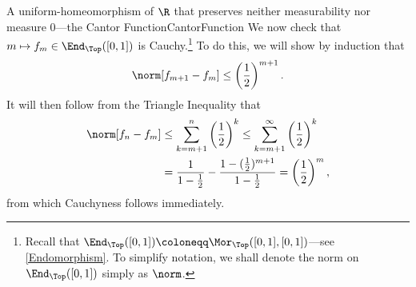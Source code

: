 \begin{exm}{A uniform-homeomorphism of $\R$ that preserves neither measurability nor measure $0$---the Cantor Function}{CantorFunction}
We now check that $m\mapsto f_m\in \End _{\Top}([0,1])$ is Cauchy.\footnote{Recall that $\End _{\Top}([0,1])\coloneqq \Mor _{\Top}([0,1],[0,1])$---see \cref{Endomorphism}.  To simplify notation, we shall denote the norm on $\End _{\Top}([0,1])$ simply as $\norm$.} To do this, we will show by induction that
\begin{equation}\label{5.2.28}
\norm[f_{m+1}-f_m]\leq \left( \frac{1}{2}\right) ^{m+1}.
\end{equation}
It will then follow from the Triangle Inequality that
\begin{equation}
\begin{split}
\norm[f_n-f_m] & \leq \sum _{k=m+1}^n\left( \frac{1}{2}\right) ^k\leq \sum _{k=m+1}^\infty \left( \frac{1}{2}\right) ^k \\
& =\frac{1}{1-\tfrac{1}{2}}-\frac{1-(\tfrac{1}{2})^{m+1}}{1-\tfrac{1}{2}}=\left( \frac{1}{2}\right) ^m,
\end{split}
\end{equation}
from which Cauchyness follows immediately.


\end{exm}
